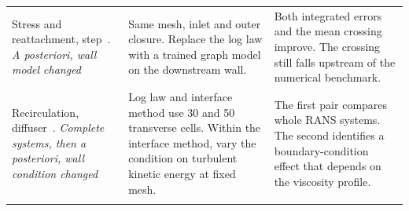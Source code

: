 \begin{table}[t]
\begin{tabular*}{\textwidth}{@{\extracolsep{\fill}}>{\raggedright\arraybackslash}p{}>{\raggedright\arraybackslash}p{}>{\raggedright\arraybackslash}p{}@{}}
Stress and reattachment, step~\cite{Dupuy2023graph}. \emph{A posteriori, wall model changed} & Same mesh, inlet and outer closure. Replace the log law with a trained graph model on the downstream wall. & Both integrated errors and the mean crossing improve. The crossing still falls upstream of the numerical benchmark. \\
Recirculation, diffuser~\cite{Jones2015}. \emph{Complete systems, then a posteriori, wall condition changed} & Log law and interface method use 30 and 50 transverse cells. Within the interface method, vary the condition on turbulent kinetic energy at fixed mesh. & The first pair compares whole RANS systems. The second identifies a boundary-condition effect that depends on the viscosity profile. \\
\botrule
\end{tabular*}
\end{table}
